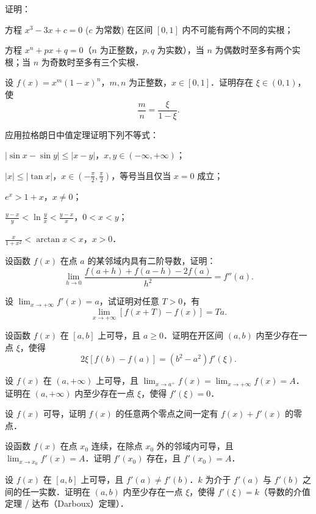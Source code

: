 \begin{xiti}
\item 证明：
\begin{ziti}
\item 方程 $x^3 - 3x + c = 0$ ($c$ 为常数) 在区间 $[0, 1]$ 内不可能有两个不同的实根；
\item 方程 $x^n + px + q = 0$（$n$ 为正整数，$p, q$ 为实数），当 $n$ 为偶数时至多有两个实根；当 $n$ 为奇数时至多有三个实根．
\end{ziti}
\item 设 $f(x) = x^m(1-x)^n$，$m, n$ 为正整数，$x\in[0, 1]$．证明存在 $\xi\in(0, 1)$，使
\[
\frac{m}{n} = \frac{\xi}{1-\xi}.
\]
\item 应用拉格朗日中值定理证明下列不等式：
\begin{ziti}
\item $|\sin x - \sin y| \leqslant |x - y|$，$x, y \in (-\infty, +\infty)$；
\item $|x| \leqslant |\tan x|$，$x\in\left(-\frac{\pi}{2}, \frac{\pi}{2}\right)$，等号当且仅当 $x = 0$ 成立；
\item $e^x > 1 + x$，$x \neq 0$；
\item $\frac{y-x}{y} < \ln\frac{y}{x} < \frac{y-x}{x}$，$0 < x < y$；
\item $\frac{x}{1+x^2} < \arctan x < x$，$x > 0$．
\end{ziti}
\item 设函数 $f(x)$ 在点 $a$ 的某邻域内具有二阶导数，证明：
\[
\lim_{h\to0} \frac{f(a+h) + f(a-h) - 2f(a)}{h^2} = f''(a).
\]
\item 设 $\lim_{x\to+\infty} f'(x) = a$，试证明对任意 $T > 0$，有
\[
\lim_{x\to+\infty} [f(x+T) - f(x)] = Ta.
\]
\item 设函数 $f(x)$ 在 $[a, b]$ 上可导，且 $a \geqslant 0$．证明在开区间 $(a, b)$ 内至少存在一点 $\xi$，使得
\[
2\xi[f(b) - f(a)] = (b^2 - a^2)f'(\xi).
\]
\item 设 $f(x)$ 在 $(a, +\infty)$ 上可导，且 $\lim_{x\to a^+} f(x) = \lim_{x\to+\infty} f(x) = A$．证明在 $(a, +\infty)$ 内至少存在一点 $\xi$，使得 $f'(\xi) = 0$．
\item 设 $f(x)$ 可导，证明 $f(x)$ 的任意两个零点之间一定有 $f(x) + f'(x)$ 的零点．
\item 设函数 $f(x)$ 在点 $x_0$ 连续，在除点 $x_0$ 外的邻域内可导，且 $\lim_{x\to x_0} f'(x) = A$．证明 $f'(x_0)$ 存在，且 $f'(x_0) = A$．
\item 设 $f(x)$ 在 $[a, b]$ 上可导，且 $f'(a) \neq f'(b)$．$k$ 为介于 $f'(a)$ 与 $f'(b)$ 之间的任一实数．证明在 $(a, b)$ 内至少存在一点 $\xi$，使得 $f'(\xi) = k$（导数的介值定理 / 达布（Darboux）定理）．

\end{xiti}
